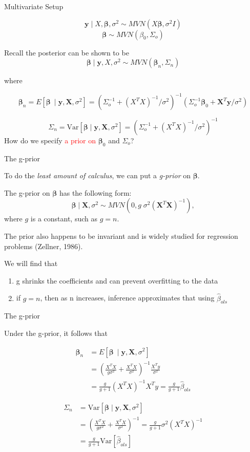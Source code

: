 \documentclass[ignorenonframetext,]{beamer}
\providecommand{\tightlist}{%
  \setlength{\itemsep}{0pt}\setlength{\parskip}{0pt}}
\newcommand{\bbeta}{\bm{\beta}}
\newcommand{\by}   {\bm{y}}
\newcommand{\bX}   {\bm{X}}
\newcommand{\Var}{\text{Var}}
\begin{document}
\begin{frame}{Multivariate Setup}

\[\by \mid X,\bbeta, \sigma^2 \sim MVN( X\bbeta, \sigma^2 I)\]
\[\bbeta \sim MVN(\beta_0, \Sigma_o) \]

Recall the posterior can be shown to be
\[\bbeta \mid \bm{y}, X, \sigma^2 \sim MVN(\bbeta_n, \Sigma_n)\]

where

\[\bbeta_n = E[\bbeta\ \mid \bm{y}, \bX, \sigma^2] = (\Sigma_o^{-1} + (X^TX)^{-1}/\sigma^2)^{-1}
(\Sigma_o^{-1}\bbeta_0 + \bX^T\bm{y}/\sigma^2)\]

\[\Sigma_n = \text{Var}[\bbeta \mid \bm{y}, \bX, \sigma^2] = (\Sigma_o^{-1} + (X^TX)^{-1}/\sigma^2)^{-1}\]
How do we specify \textcolor{red}{a prior on} \(\bbeta_0\) and
\(\Sigma_o\)?

\end{frame}

\begin{frame}{The g-prior}

To do the \emph{least amount of calculus}, we can put a \emph{g-prior}
on \(\bbeta.\)

The g-prior on \(\bbeta\) has the following form:
\[ \bbeta \mid \bX, \sigma^2  \sim MVN(0, g\; \sigma^2 (\bX^T\bX)^{-1}),\]
where \(g\) is a constant, such as \(g=n.\)

The prior also happens to be invariant and is widely studied for
regression problems (Zellner, 1986).

We will find that

\begin{enumerate}
\def\labelenumi{\arabic{enumi}.}
\tightlist
\item
  g shrinks the coefficients and can prevent overfitting to the data
\item
  if \(g = n\), then as n increases, inference approximates that using
  \(\hat{\beta}_{ols}\)
\end{enumerate}

\end{frame}

\begin{frame}{The g-prior}

Under the g-prior, it follows that

\begin{align}
\bbeta_n &= E[\bbeta\ \mid \bm{y}, \bX, \sigma^2]  \\
&= \left(\frac{X^TX}{g \sigma^2} + \frac{X^TX}{\sigma^2}\right)^{-1} \frac{X^Ty}{\sigma^2} \\
&= \frac{g}{g+1} (X^TX)^{-1} X^Ty
= \frac{g}{g+1} \hat{\beta}_{ols}
\end{align}

\begin{align}
\Sigma_n &= \text{Var}[\bbeta \mid \bm{y}, \bX, \sigma^2] \\
&= \left(\frac{X^TX}{g \sigma^2} + \frac{X^TX}{\sigma^2}\right)^{-1}
=\frac{g}{g+1} \sigma^2 (X^TX)^{-1} \\
&= \frac{g}{g+1} \Var[\hat{\beta}_{ols}]
\end{align}

\end{frame}
\end{document}
